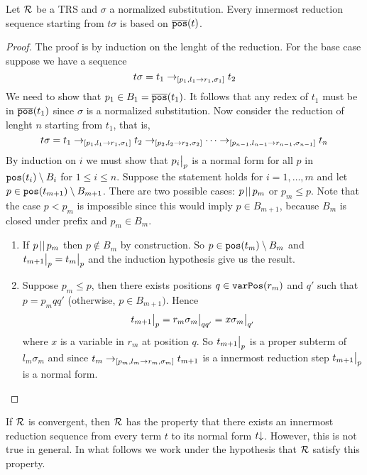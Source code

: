 \begin{proposition}\label{proposition:innermost-based-on-t}
	Let $\mathcal{R}$ be a TRS and $\sigma$ a normalized substitution. Every innermost reduction sequence starting from $t\sigma$ is based on $\overline{\mathtt{pos}}(t)$.
	\begin{proof}
		The proof is by induction on the lenght of the reduction. For the base case suppose we have a sequence
		$$ t\sigma = t_1 \rightarrow_{[p_1, l_1 \rightarrow r_1, \sigma_1]} t_2 $$
		We need to show that $p_1 \in B_1 = \overline{\mathtt{pos}}(t_1)$. It follows that any redex of $t_1$ must be in $\overline{\mathtt{pos}}(t_1)$ since $\sigma$ is a normalized substitution.
		Now consider the reduction of lenght $n$ starting from $t_1$, that is,
		$$t \sigma = t_1 \rightarrow_{[p_1, l_1 \rightarrow r_1, \sigma_1]} t_2 \rightarrow_{[p_2, l_2 \rightarrow r_2, \sigma_2]} \cdots \rightarrow_{[p_{n-1}, l_{n-1} \rightarrow r_{n-1}, \sigma_{n-1}]} t_n$$
		By induction on $i$ we must show that $\restr{p_i}{p}$ is a normal form for all $p$ in $\mathtt{pos}(t_i)\setminus B_i$ for $1 \leq i \leq n$. Suppose the statement holds for $i = 1, \dots, m$ and let $p \in \mathtt{pos}(t_{m+1}) \setminus B_{m+1}$. There are two possible cases: $p\,||\,p_m$ or $p_m \leq p$. Note that the case $p < p_m$ is impossible since this would imply $p \in B_{m+1}$, because $B_m$ is closed under prefix and $p_m \in B_m$.
		\begin{enumerate}
			\item If $p\,||\,p_m$ then $p \notin B_m$ by construction. So $p \in \mathtt{pos}(t_m) \setminus B_m$ and $\restr{t_{m+1}}{p} = \restr{t_m}{p}$ and the induction hypothesis give us the result.
			\item Suppose $p_m \leq p$, then there exists positions $q \in \mathtt{varPos}(r_m)$ and $q'$ such that $p = p_m q q'$ (otherwise, $p \in B_{m+1})$. Hence
			      $$\restr{t_{m+1}}{p} = \restr{r_m\sigma_m}{qq'} = \restr{x\sigma_m}{q'}$$
			      where $x$ is a variable in $r_m$ at position $q$. So $\restr{t_{m+1}}{p}$ is a proper subterm of $l_m\sigma_m$ and since $t_m \rightarrow_{[p_m, l_m \rightarrow r_m, \sigma_m]}t_{m+1}$ is a innermost reduction step $\restr{t_{m+1}}{p}$ is a normal form.
		\end{enumerate}
	\end{proof}
\end{proposition}

If $\mathcal{R}$ is convergent, then $\mathcal{R}$ has the property that there exists an innermost reduction sequence from every term $t$ to its normal form $t\mathord{\downarrow}$. However, this is not true in general. In what follows we work under the hypothesis that $\mathcal{R}$ satisfy this property.

